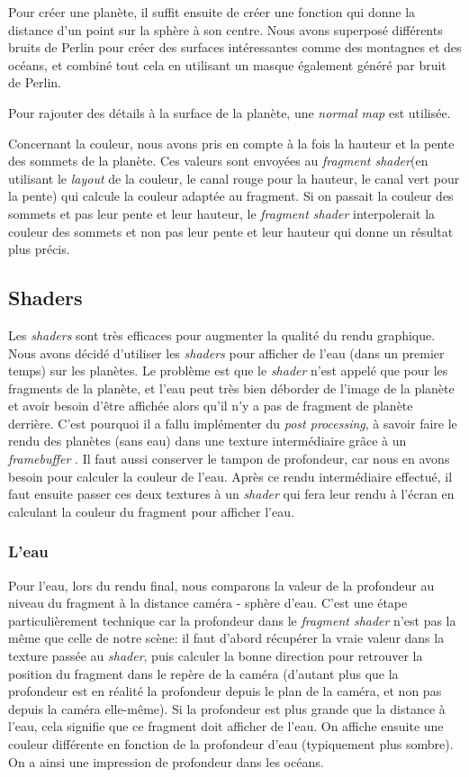 \documentclass[a4paper,12pt,twoside]{article}
\begin{document}
Pour créer une planète, il suffit ensuite de créer une fonction qui donne la distance d'un point sur la sphère à son centre. Nous avons superposé différents bruits de Perlin pour créer des surfaces intéressantes comme des montagnes et des océans, et combiné tout cela en utilisant un masque également généré par bruit de Perlin.

Pour rajouter des détails à la surface de la planète, une \textit{normal map} est utilisée.

Concernant la couleur, nous avons pris en compte à la fois la hauteur et la pente des sommets de la planète. Ces valeurs sont envoyées au \textit{fragment shader}(en utilisant le \textit{layout} de la couleur, le canal rouge pour la hauteur, le canal vert pour la pente) qui calcule la couleur adaptée au fragment. Si on passait la couleur des sommets et pas leur pente et leur hauteur, le \textit{fragment shader} interpolerait la couleur des sommets et non pas leur pente et leur hauteur qui donne un résultat plus précis.

\subsection{Shaders}

Les \textit{shaders} sont très efficaces pour augmenter la qualité du rendu graphique. Nous avons décidé d'utiliser les \textit{shaders} pour afficher de l'eau (dans un premier temps) sur les planètes. Le problème est que le \textit{shader} n'est appelé que pour les fragments de la planète, et l'eau peut très bien déborder de l'image de la planète et avoir besoin d'être affichée alors qu'il n'y a pas de fragment de planète derrière. C'est pourquoi il a fallu implémenter du \textit{post processing}, à savoir faire le rendu des planètes (sans eau) dans une texture intermédiaire grâce à un \textit{framebuffer} \cite{postprocessing}. Il faut aussi conserver le tampon de profondeur, car nous en avons besoin pour calculer la couleur de l'eau. Après ce rendu intermédiaire effectué, il faut ensuite passer ces deux textures à un \textit{shader} qui fera leur rendu à l'écran en calculant la couleur du fragment pour afficher l'eau.

\subsubsection{L'eau}

Pour l'eau, lors du rendu final, nous comparons la valeur de la profondeur au niveau du fragment à la distance caméra - sphère d'eau. C'est une étape particulièrement technique car la profondeur dans le  \textit{fragment shader} n'est pas la même que celle de notre scène: il faut d'abord récupérer la vraie valeur dans la texture passée au \textit{shader}, puis calculer la bonne direction pour retrouver la position du fragment dans le repère de la caméra (d'autant plus que la profondeur est en réalité la profondeur depuis le plan de la caméra, et non pas depuis la caméra elle-même). Si la profondeur est plus grande que la distance à l'eau, cela signifie que ce fragment doit afficher de l'eau. On affiche ensuite une couleur différente en fonction de la profondeur d'eau (typiquement plus sombre). On a ainsi une impression de profondeur dans les océans.
\end{document}
